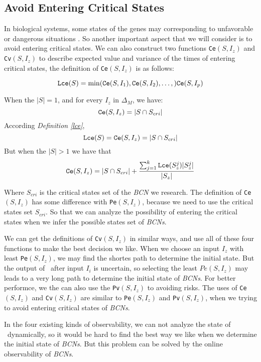 \subsection{Avoid Entering Critical States}
In biological systems, some states of the genes may corresponding to unfavorable or dangerous situations \cite{Li2014Controllability}. So another important aspect that we will consider is to avoid entering critical states. We can also construct two functions {\tt Ce}$(S, I_z)$ and {\tt Cv}$(S, I_z)$ to describe expected value and variance of the times of entering critical states, the definition of {\tt Ce}$(S, I_z)$ is as follows:\\
\begin{definition}[{\tt Lce}$(S)$] \label{lce}
\[{\tt Lce}(S)= \min({\tt Ce}(S, I_1),{\tt Ce}(S, I_2),\ldots,){\tt Ce}(S, I_p)\]
\end{definition}
\begin{definition}[{\tt Ce}$(S, I_z)$] 
When the $|S|=1$, and for every $I_z$ in $\Delta_M$, we have: \[{\tt Ce}(S, I_z)=|S \cap S_{cri} |\] 
According {\em Definition \ref{lce}}, %
\[{\tt Lce}(S)={\tt Ce}(S, I_z)=|S \cap S_{cri} |\] 
But when the $|S|>1$ 
we have that 
\[{\tt Ce}(S, I_z)=|S \cap S_{cri} | +\frac{\sum_{j=1}^k {\tt Lce}(S_z^j)|S_z^j|}{ |S_z|} \] 
\end{definition}

Where $S_{cri}$ is the critical states set of the {\em BCN} we research. The definition of {\tt Ce}$(S, I_z)$ has some difference with {\tt Pe}$(S, I_z)$, because we need to use the critical states set $S_{cri}$. So that  we can analyze the possibility of entering the  critical states when we infer the possible states set of {\em BCNs}.

We can get the definitions of {\tt Cv}$(S, I_z)$ in similar ways, and use all of these four functions to make the best decision we like. When we choose an input $I_z$ with least {\tt Pe}$(S, I_z)$, we may find the shortes path to determine the initial state. But the output of \BCNs\ after input $I_i$ is uncertain, so selecting the least $Pe(S, I_z)$ may leads to a very long path to determine the initial state of {\em BCNs}. For better performce, we the can also use the {\tt Pv}$(S, I_z)$ to avoiding risks. The uses of {\tt Ce}$(S, I_z)$ and {\tt Cv}$(S, I_z)$ are similar to {\tt Pe}$(S, I_z)$ and {\tt Pv}$(S, I_z)$, when we trying to avoid entering critical states of {\em BCNs}.

In the four existing kinds of observability, we can not analyze the state of \BCNs\ dynamically, so it would be hard to find the best way we like when we determine the initial state of {\em BCNs}. But this problem can be solved by the online observability of {\em BCNs}.